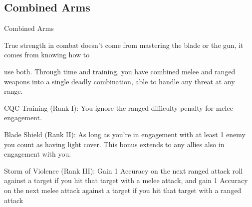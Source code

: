 \subsection{Combined Arms}

                                             Combined Arms  

True strength in combat doesn’t come from mastering the blade or the gun, it comes from knowing how to  

use both. Through time and training, you have combined melee and ranged weapons into a single deadly  
combination, able to handle any threat at any range.    

CQC Training (Rank I): You ignore the ranged difficulty penalty for melee engagement.
 
Blade Shield (Rank II): As long as you’re in engagement with at least 1 enemy you count as  
having light cover. This bonus extends to any allies also in engagement with you.
 
Storm of Violence (Rank III): Gain 1 Accuracy on the next ranged attack roll against a target if  
you hit that target with a melee attack, and gain 1 Accuracy on the next melee attack against a  
target if you hit that target with a ranged attack